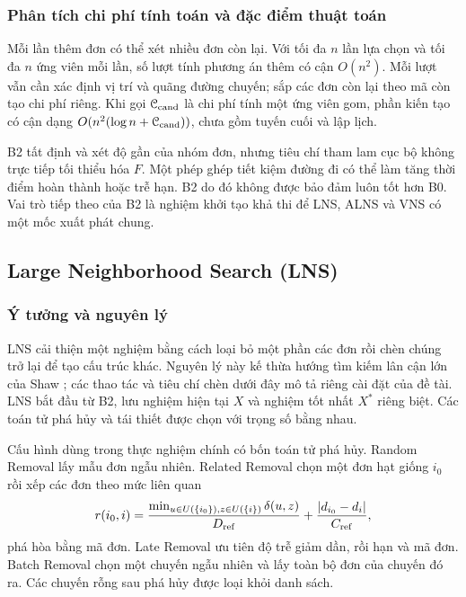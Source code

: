 \subsubsection{Phân tích chi phí tính toán và đặc điểm thuật toán}
Mỗi lần thêm đơn có thể xét nhiều đơn còn lại. Với tối đa $n$ lần lựa chọn và tối đa $n$ ứng viên mỗi lần, số lượt tính phương án thêm có cận $O(n^2)$. Mỗi lượt vẫn cần xác định vị trí và quãng đường chuyến; sắp các đơn còn lại theo mã còn tạo chi phí riêng. Khi gọi $\mathcal C_{\rm cand}$ là chi phí tính một ứng viên gom, phần kiến tạo có cận dạng $O(n^2(\log n+\mathcal C_{\rm cand}))$, chưa gồm tuyến cuối và lập lịch.

B2 tất định và xét độ gần của nhóm đơn, nhưng tiêu chí tham lam cục bộ không trực tiếp tối thiểu hóa $F$. Một phép ghép tiết kiệm đường đi có thể làm tăng thời điểm hoàn thành hoặc trễ hạn. B2 do đó không được bảo đảm luôn tốt hơn B0. Vai trò tiếp theo của B2 là nghiệm khởi tạo khả thi để LNS, ALNS và VNS có một mốc xuất phát chung.

\subsection[Large Neighborhood Search]{Large Neighborhood Search (LNS)}

\subsubsection{Ý tưởng và nguyên lý}
LNS cải thiện một nghiệm bằng cách loại bỏ một phần các đơn rồi chèn chúng trở lại để tạo cấu trúc khác. Nguyên lý này kế thừa hướng tìm kiếm lân cận lớn của Shaw \cite{shaw1998}; các thao tác và tiêu chí chèn dưới đây mô tả riêng cài đặt của đề tài. LNS bắt đầu từ B2, lưu nghiệm hiện tại $X$ và nghiệm tốt nhất $X^*$ riêng biệt. Các toán tử phá hủy và tái thiết được chọn với trọng số bằng nhau.

Cấu hình dùng trong thực nghiệm chính có bốn toán tử phá hủy. Random Removal lấy mẫu đơn ngẫu nhiên. Related Removal chọn một đơn hạt giống $i_0$ rồi xếp các đơn theo mức liên quan
\begin{equation}
 r(i_0,i)=\frac{\min_{u\in U(\{i_0\}),z\in U(\{i\})}\delta(u,z)}{D_{\rm ref}}
 +\frac{|d_{i_0}-d_i|}{C_{\rm ref}},\label{eq:related-removal}
\end{equation}
phá hòa bằng mã đơn. Late Removal ưu tiên độ trễ giảm dần, rồi hạn và mã đơn. Batch Removal chọn một chuyến ngẫu nhiên và lấy toàn bộ đơn của chuyến đó ra. Các chuyến rỗng sau phá hủy được loại khỏi danh sách.

